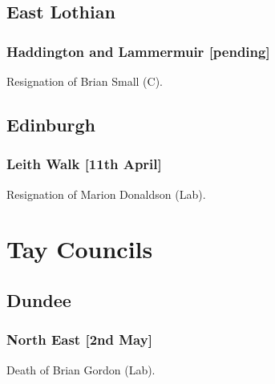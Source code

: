 \documentclass[a4paper,openany]{book}
\begin{document}
\begin{resultsiii}

\subsection*{East Lothian}

\subsubsection*{Haddington and Lammermuir \hspace*{\fill}\nolinebreak[1]%
	\enspace\hspace*{\fill}
	[pending]}


Resignation of Brian Small (C).

\subsection*{Edinburgh}

\subsubsection*{Leith Walk \hspace*{\fill}\nolinebreak[1]%
	\enspace\hspace*{\fill}
	[11th April]}


Resignation of Marion Donaldson (Lab).

\section{Tay Councils}

\subsection*{Dundee}

\subsubsection*{North East \hspace*{\fill}\nolinebreak[1]%
	\enspace\hspace*{\fill}
	[2nd May]}


Death of Brian Gordon (Lab).

\end{resultsiii}
\end{document}
